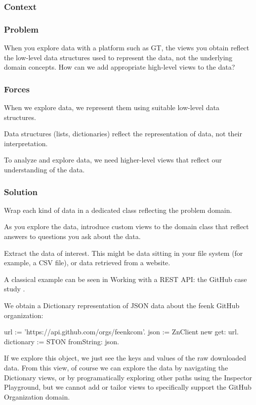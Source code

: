 \documentclass[sigconf]{acmart}
\begin{document}
\subsubsection*{Context}
\subsubsection*{Problem}

When you explore data with a platform such as GT, the views you obtain reflect the low-level data structures used to represent the data, not the underlying domain concepts. How can we add appropriate high-level views to the data?

\subsubsection*{Forces}

When we explore data, we represent them using suitable low-level data structures.

Data structures (lists, dictionaries) reflect the representation of data, not their interpretation.

To analyze and explore data, we need higher-level views that reflect our understanding of the data.


\subsubsection*{Solution}

Wrap each kind of data in a dedicated class reflecting the problem domain. 

As you explore the data, introduce custom views to the domain class that reflect answers to questions you ask about the data.

Extract the data of interest. This might be data sitting in your file system (for example, a CSV file), or data retrieved from a website.

A classical example can be seen in Working with a REST API: the GitHub case study .

We obtain a Dictionary representation of JSON data about the feenk GitHub organization:

url := 'https://api.github.com/orgs/feenkcom'.
json := ZnClient new get: url.
dictionary := STON fromString: json.
  
If we explore this object, we just see the keys and values of the raw downloaded data. From this view, of course we can explore the data by navigating the Dictionary views, or by programatically exploring other paths using the Inspector Playground, but we cannot add or tailor views to specifically support the GitHub Organization domain.
\end{document}
